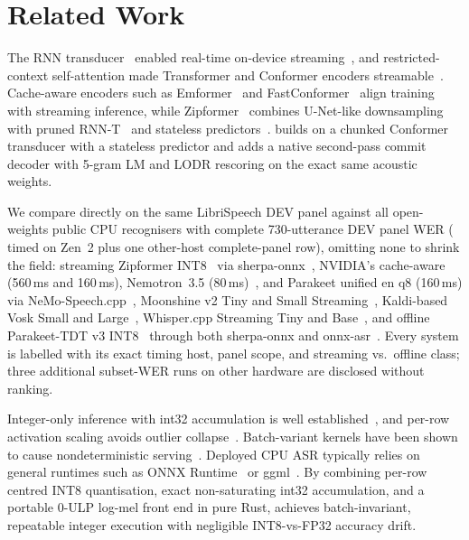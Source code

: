 \section{Related Work}\label{sec:related}

 The RNN transducer~\cite{graves2012rnnt} enabled
real-time on-device streaming~\cite{he2019streaming}, and restricted-context self-attention made
Transformer and Conformer encoders
streamable~\cite{gulati2020conformer,zhang2020transformertransducer,chen2021developing,yao2021wenet}.
Cache-aware encoders such as Emformer~\cite{shi2021emformer} and
FastConformer~\cite{rekesh2023fastconformer,noroozi2024stateful} align training with streaming
inference, while Zipformer~\cite{yao2024zipformer} combines U-Net-like downsampling with pruned
RNN-T~\cite{kuang2022pruned} and stateless predictors~\cite{ghodsi2020stateless}. \ultra{} builds
on a chunked Conformer transducer with a stateless predictor and adds a native second-pass commit
decoder with 5-gram LM and LODR rescoring on the exact same acoustic weights.

 We compare directly on the same LibriSpeech DEV panel against all
\ColdCompleteCompCount{} open-weights public CPU recognisers with complete 730-utterance DEV panel
WER (\ColdComparatorCount{} timed on Zen~2 plus one other-host complete-panel row), omitting none to
shrink the field: streaming Zipformer INT8~\cite{yao2024zipformer,icefall} via
sherpa-onnx~\cite{sherpaonnx}, NVIDIA's cache-aware \NemotronEN~\cite{nemotron} (560\,ms and
160\,ms), Nemotron~3.5 (80\,ms)~\cite{nvidia2026nemotron35}, and Parakeet unified en q8 (160\,ms)
via NeMo-Speech.cpp~\cite{nemospeechcpp}, Moonshine v2 Tiny and Small
Streaming~\cite{kudlur2026moonshinev2}, Kaldi-based Vosk Small and Large~\cite{vosk}, Whisper.cpp
Streaming Tiny and Base~\cite{radford2023whisper,whispercpp}, and offline Parakeet-TDT v3
INT8~\cite{xu2023tdt,nvidia2025parakeettdtv3} through both sherpa-onnx and
onnx-asr~\cite{onnxasr}. Every system is labelled with its exact timing host, panel scope, and
streaming vs.\ offline class; three additional subset-WER runs on other hardware are disclosed
without ranking.

 Integer-only inference with int32 accumulation is well
established~\cite{jacob2018quantization,kim2021ibert,wu2020integer,nagel2021whitepaper}, and
per-row activation scaling avoids outlier collapse~\cite{dettmers2022llmint8}. Batch-variant
kernels have been shown to cause nondeterministic serving~\cite{he2025nondeterminism}. Deployed
CPU ASR typically relies on general runtimes such as ONNX Runtime~\cite{onnxruntime} or
ggml~\cite{nemospeechcpp}. By combining per-row centred INT8 quantisation, exact non-saturating
int32 accumulation, and a portable 0-ULP log-mel front end in pure Rust, \ultra{} achieves
batch-invariant, repeatable integer execution with negligible INT8-vs-FP32 accuracy drift.
